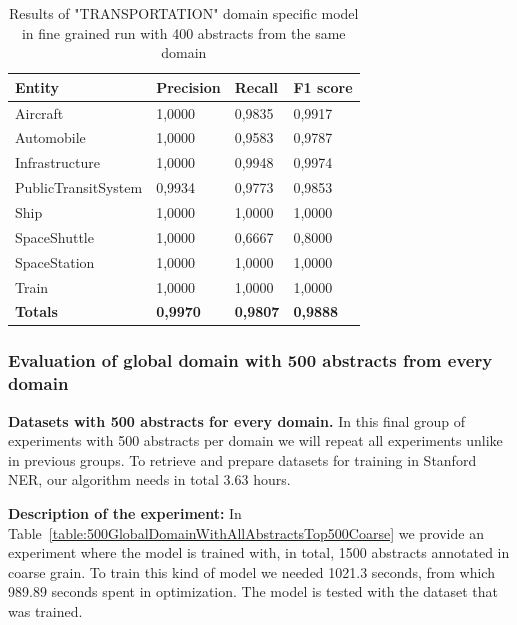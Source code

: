 \documentclass[thesis=M,english]{FITthesis}[2018/05/30]
\begin{document}
	\begin{table}[H]\centering
		\begin{tabular}{|l|l|l|l|}
			\hline {\textbf{Entity}} & {\textbf{Precision}} & {\textbf{Recall}} & {\textbf{F1 score}}\\\hline
				Aircraft & 1,0000 & 0,9835 & 0,9917\\
				Automobile & 1,0000 & 0,9583 & 0,9787\\				
				Infrastructure & 1,0000 & 0,9948 & 0,9974\\
				PublicTransitSystem & 0,9934 & 0,9773 & 0,9853\\
				Ship & 1,0000 & 1,0000 & 1,0000\\				
				SpaceShuttle & 1,0000 & 0,6667 & 0,8000\\
				SpaceStation & 1,0000 & 1,0000 & 1,0000\\
				Train & 1,0000 & 1,0000 & 1,0000\\\hline
				\textbf{Totals} & \textbf{0,9970} & \textbf{0,9807} & \textbf{0,9888}\\\hline
		\end{tabular}
		\caption{Results of "TRANSPORTATION" domain specific model in fine grained run with 400 abstracts from the same domain \label{table:400TransportationDomainWithTransportationTop400Fine}}
	\end{table}	


\subsubsection{Evaluation of global domain with 500 abstracts from every domain }

\textbf{Datasets with 500 abstracts for every domain.} In this final group of experiments with 500 abstracts per domain we will repeat all experiments unlike in previous groups. To retrieve and prepare datasets for training in Stanford NER, our algorithm needs in total 3.63 hours.  

	\textbf{Description of the experiment:} In Table~\ref{table:500GlobalDomainWithAllAbstractsTop500Coarse} we provide an experiment where the model is trained with, in total, 1500 abstracts annotated in coarse grain. To train this kind of model we needed  1021.3 seconds, from which 989.89 seconds spent in optimization. The model is tested with the dataset that was trained. 
\end{document}
